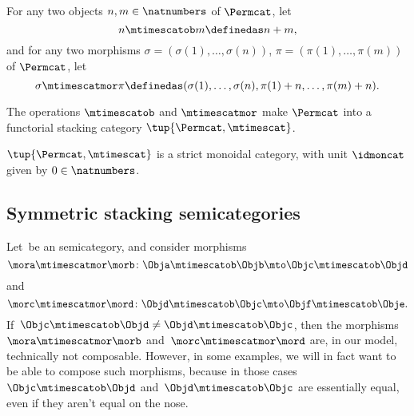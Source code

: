 \begin{definition}
    For any two objects $n, m \in \natnumbers$ of $\Permcat$, let
    \begin{equation}
        n \mtimescatob m \definedas n + m,
    \end{equation}
    and for any two morphisms $\sigma = (\sigma(1), \dots, \sigma(n))$, $\pi =  (\pi(1), \dots, \pi(m))$ of $\Permcat$, let
    \begin{equation}
        \sigma \mtimescatmor \pi \definedas (\sigma(1), \dots, \sigma(n), \pi(1) + n, \dots, \pi(m) + n).
    \end{equation}
\end{definition}

\begin{lemma}
    The operations $\mtimescatob$ and $\mtimescatmor$ make $\Permcat$ into a functorial stacking category $\tup{\Permcat, \mtimescat}$.
\end{lemma}


\begin{lemma}
    $\tup{\Permcat, \mtimescat}$ is a strict monoidal category, with unit $\idmoncat$ given by $0 \in \natnumbers$.
\end{lemma}



\subsection{Symmetric stacking semicategories}

Let~\CatC be an  semicategory, and consider morphisms
\begin{equation}
    \mora \mtimescatmor \morb \colon \Obja \mtimescatob \Objb \mto \Objc \mtimescatob \Objd
\end{equation}
and
\begin{equation}
    \morc \mtimescatmor \mord \colon \Objd \mtimescatob \Objc \mto \Objf \mtimescatob \Obje.
\end{equation}
If~$\Objc \mtimescatob \Objd \neq \Objd \mtimescatob \Objc$, then the morphisms~$\mora \mtimescatmor \morb$ and~$\morc \mtimescatmor \mord$ are, in our model, technically not composable.
However, in some examples, we will in fact want to be able to compose such morphisms, because in those cases~$\Objc \mtimescatob \Objd$ and~$\Objd \mtimescatob \Objc$ are essentially equal, even if they aren't equal on the nose.

